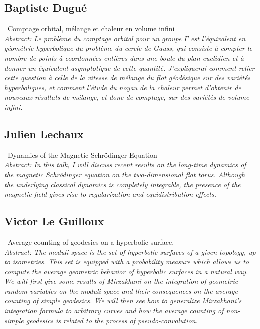 \documentclass[12pt,a4paper]{amsart}
\begin{document}
\bigskip

\subsection*{Baptiste Dugué} \, Comptage orbital, mélange et chaleur en volume infini \smallskip \\
\textit{Abstract: Le problème du comptage orbital pour un groupe $\Gamma$ est l'équivalent en géométrie hyperbolique du problème du cercle de Gauss, qui consiste à compter le nombre de points à coordonnées entières dans une boule du plan euclidien et à donner un équivalent asymptotique de cette quantité. J'expliquerai comment relier cette question à celle de la vitesse de mélange du flot géodésique sur des variétés hyperboliques, et comment l'étude du noyau de la chaleur permet d'obtenir de nouveaux résultats de mélange, et donc de comptage, sur des variétés de volume infini.}

\bigskip

\subsection*{Julien Lechaux} \, Dynamics of the Magnetic Schrödinger Equation \medskip \\
\textit{Abstract: In this talk, I will discuss recent results on the long-time dynamics of the magnetic Schrödinger equation on the two-dimensional flat torus. Although the underlying classical dynamics is completely integrable, the presence of the magnetic field gives rise to regularization and equidistribution effects.}

\bigskip

\subsection*{Victor Le Guilloux} \, Average counting of geodesics on a hyperbolic surface. \medskip \\
\textit{Abstract: The moduli space is the set of hyperbolic surfaces of a given topology, up to isometries. This set is equipped with a probability measure which allows us to compute the average geometric behavior of hyperbolic surfaces in a natural way. We will first give some results of Mirzakhani on the integration of geometric random variables on the moduli space and their consequences on the average counting of simple geodesics. We will then see how to generalize Mirzakhani's integration formula to arbitrary curves and how the average counting of non-simple geodesics is related to the process of pseudo-convolution.}
\end{document}
